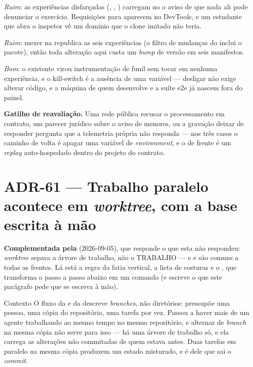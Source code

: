 \emph{Ruim}: as experiências disfarçadas (, ,
) carregam no  o aviso de que nada ali pode
denunciar o exercício. Requisições para  aparecem no DevTools, e
um estudante que abra o inspetor vê um domínio que o clone imitado não teria.

\emph{Ruim}: mexer na  republica as seis experiências (o filtro de
mudanças do  inclui o pacote), então toda alteração aqui custa
um \emph{bump} de versão em seis manifestos.

\emph{Bom}: o  existente virou instrumentação de funil sem tocar em
nenhuma experiência, e o kill-switch é a ausência de uma variável --- desligar
não exige alterar código, e a máquina de quem desenvolve e a suíte e2e já
nascem fora do painel.

\textbf{Gatilho de reavaliação.} Uma rede pública recusar o processamento em
contrato, um parecer jurídico sobre o aviso de menores, ou a gravação deixar de
responder pergunta que a telemetria própria não responda --- nos três casos o
caminho de volta é apagar uma variável de \emph{environment}, e o de frente é
um \emph{replay} auto-hospedado dentro do projeto do contrato.

\section{ADR-61 --- Trabalho paralelo acontece em \emph{worktree}, com a base
escrita à mão}
\label{adr:worktree}

\textbf{Complementada pela } (2026-09-05), que responde o que esta
não respondeu: \emph{worktree} separa a árvore de trabalho, não o TRABALHO ---
e  e  são comuns a todas as frentes. Lá está a
regra da fatia vertical, a lista de costuras e o , que
transforma o passo a passo abaixo em um comando (e escreve o 
que este parágrafo pede que se escreva à mão).

\begin{especificacao}{Contexto}
O fluxo da  e da  descreve \emph{branches}, não
diretórios: pressupõe uma pessoa, uma cópia do repositório, uma tarefa por vez.
Passou a haver mais de um agente trabalhando ao mesmo tempo no mesmo
repositório, e alternar de \emph{branch} na mesma cópia não serve para isso ---
há uma árvore de trabalho só, e ela carrega as alterações não commitadas de
quem estava antes. Duas tarefas em paralelo na mesma cópia produzem um estado
misturado, e é dele que sai o \emph{commit}.
\end{especificacao}

